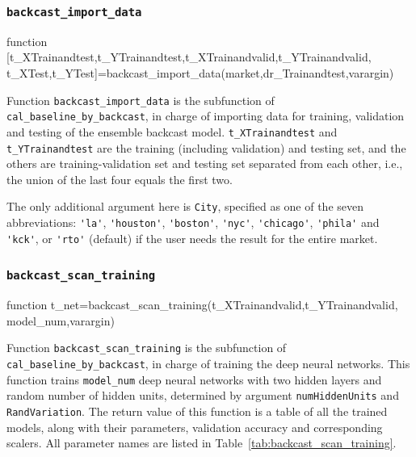 \documentclass[10pt]{article}
\numberwithin{equation}{section}
\numberwithin{table}{section}
\numberwithin{figure}{section}
\begin{document}
\subsubsection{\texttt{backcast\_import\_data}}\label{func:backcast_import_data}

\begin{Code}
function [t_XTrainandtest,t_YTrainandtest,t_XTrainandvalid,t_YTrainandvalid,
t_XTest,t_YTest]=backcast_import_data(market,dr_Trainandtest,varargin)
\end{Code}

Function \verb!backcast_import_data! is the subfunction of \verb!cal_baseline_by_backcast!, in charge of importing data for training, validation and testing of the ensemble backcast model. \verb!t_XTrainandtest! and \verb!t_YTrainandtest! are the training (including validation) and testing set, and the others are training-validation set and testing set separated from each other, i.e., the union of the last four equals the first two.

The only additional argument here is \verb!City!, specified as one of the seven abbreviations: \verb!'la'!,  \verb!'houston'!, \verb!'boston'!, \verb!'nyc'!, \verb!'chicago'!, \verb!'phila'! and \verb!'kck'!, or \verb!'rto'! (default) if the user needs the result for the entire market.



\subsubsection{\texttt{backcast\_scan\_training}}\label{func:backcast_scan_training}

\begin{Code}
function t_net=backcast_scan_training(t_XTrainandvalid,t_YTrainandvalid,
model_num,varargin)
\end{Code}

Function \verb!backcast_scan_training! is the subfunction of \verb!cal_baseline_by_backcast!, in charge of training the deep neural networks. This function trains \verb!model_num! deep neural networks with two hidden layers and random number of hidden units, determined by argument \verb!numHiddenUnits! and \verb!RandVariation!. The return value of this function is a table of all the trained models, along with their parameters, validation accuracy and corresponding scalers. All parameter names are listed in Table~\ref{tab:backcast_scan_training}.
\end{document}
